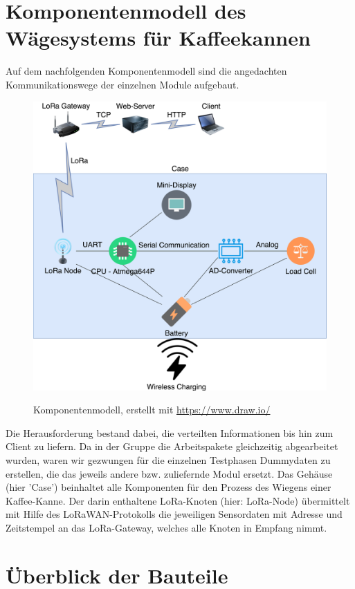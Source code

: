 \chapter{Komponentenmodell des Wägesystems für Kaffeekannen}
Auf dem nachfolgenden Komponentenmodell sind die angedachten Kommunikationswege der einzelnen Module aufgebaut. 
\begin{figure}[H]
    \center
    \includegraphics[width=15cm]{Bilder/komponentenmodell.png}\\
    \caption{Komponentenmodell, erstellt mit \url{https://www.draw.io/}}
    \label{fig:Komponentenmodell}
\end{figure}
Die Herausforderung bestand dabei, die verteilten Informationen bis hin zum Client zu liefern. Da in der Gruppe die Arbeitspakete gleichzeitig abgearbeitet wurden, waren wir gezwungen für die einzelnen Testphasen Dummydaten zu erstellen, die das jeweils andere bzw. zuliefernde Modul ersetzt.
Das Gehäuse (hier 'Case') beinhaltet alle Komponenten für den Prozess des Wiegens einer Kaffee-Kanne. Der darin enthaltene LoRa-Knoten (hier: LoRa-Node) übermittelt mit Hilfe des LoRaWAN-Protokolls die jeweiligen Sensordaten mit Adresse und Zeitstempel an das LoRa-Gateway, welches alle Knoten in Empfang nimmt.

\chapter{Überblick der Bauteile}
